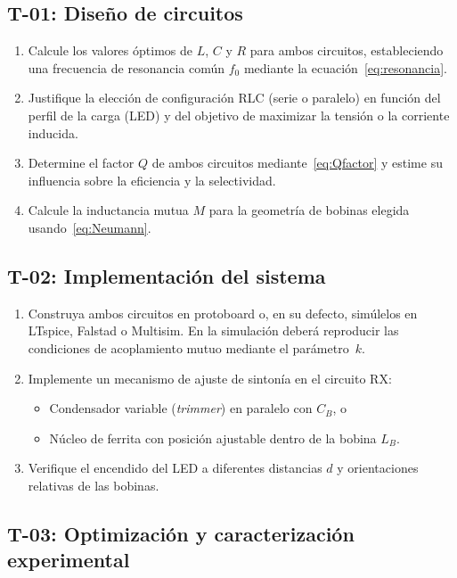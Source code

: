 \documentclass[11pt,a4paper]{article}
\begin{document}
\subsection{T-01: Diseño de circuitos}

\begin{enumerate}
  \item Calcule los valores óptimos de $L$, $C$ y $R$ para ambos circuitos, estableciendo una
        frecuencia de resonancia común $f_0$ mediante la ecuación~\eqref{eq:resonancia}.
  \item Justifique la elección de configuración RLC (serie o paralelo) en función del
        perfil de la carga (LED) y del objetivo de maximizar la tensión o la corriente inducida.
  \item Determine el factor $Q$ de ambos circuitos mediante~\eqref{eq:Qfactor} y estime
        su influencia sobre la eficiencia y la selectividad.
  \item Calcule la inductancia mutua $M$ para la geometría de bobinas elegida usando~\eqref{eq:Neumann}.
\end{enumerate}

\subsection{T-02: Implementación del sistema}

\begin{enumerate}
  \item Construya ambos circuitos en protoboard o, en su defecto, simúlelos en
        LTspice, Falstad o Multisim. En la simulación deberá reproducir las
        condiciones de acoplamiento mutuo mediante el parámetro~$k$.
  \item Implemente un mecanismo de ajuste de sintonía en el circuito RX:
        \begin{itemize}
          \item Condensador variable (\textit{trimmer}) en paralelo con $C_B$, o
          \item Núcleo de ferrita con posición ajustable dentro de la bobina $L_B$.
        \end{itemize}
  \item Verifique el encendido del LED a diferentes distancias $d$ y orientaciones relativas
        de las bobinas.
\end{enumerate}

\subsection{T-03: Optimización y caracterización experimental}
\end{document}
